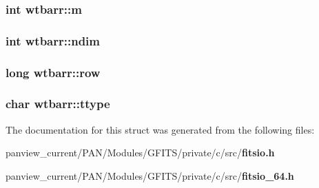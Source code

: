 \subsubsection{\setlength{\rightskip}{0pt plus 5cm}int \bf{wtbarr::m}}\label{structwtbarr_1e88ad32570534a006e96cba721489b5}


\subsubsection{\setlength{\rightskip}{0pt plus 5cm}int \bf{wtbarr::ndim}}\label{structwtbarr_f862b4f90b0406ed8dd0c240768d4bd3}


\subsubsection{\setlength{\rightskip}{0pt plus 5cm}long \bf{wtbarr::row}}\label{structwtbarr_2ff7c235353320c6dd98951484012ee7}


\subsubsection{\setlength{\rightskip}{0pt plus 5cm}char \bf{wtbarr::ttype}}\label{structwtbarr_750832793167bbeebd1074e29844415d}




The documentation for this struct was generated from the following files:\begin{CompactItemize}
\item 
panview\_\-current/PAN/Modules/GFITS/private/c/src/\bf{fitsio.h}\item 
panview\_\-current/PAN/Modules/GFITS/private/c/src/\bf{fitsio\_\-64.h}\end{CompactItemize}
